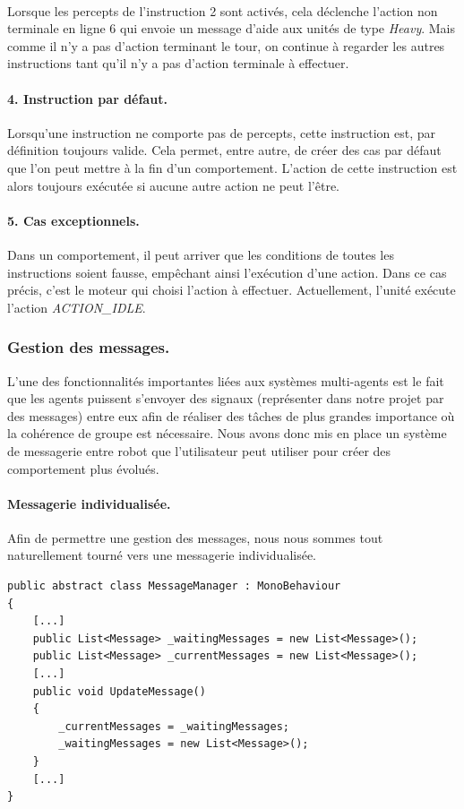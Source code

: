 \documentclass{report}
\begin{document}
\paragraph{}Lorsque les percepts de l'instruction 2 sont activés, cela déclenche l'action non terminale en ligne 6 qui envoie un message d'aide aux unités de type \textit{Heavy}. Mais comme il n'y a pas d'action terminant le tour, on continue à regarder les autres instructions tant qu'il n'y a pas d'action terminale à effectuer.

\paragraph{4. Instruction par défaut.}
Lorsqu'une instruction ne comporte pas de percepts, cette instruction est, par définition toujours valide. Cela permet, entre autre, de créer des cas par défaut que l'on peut mettre à la fin d'un comportement. L'action de cette instruction est alors toujours exécutée si aucune autre action ne peut l'être.

\paragraph{5. Cas exceptionnels.}
Dans un comportement, il peut arriver que les conditions de toutes les instructions soient fausse, empêchant ainsi l'exécution d'une action. Dans ce cas précis, c'est le moteur qui choisi l'action à effectuer. Actuellement, l'unité exécute l'action \textit{ACTION\_IDLE}.

\subsubsection{Gestion des messages.}
L'une des fonctionnalités importantes liées aux systèmes multi-agents est le fait que les agents puissent s'envoyer des signaux (représenter dans notre projet par des messages) entre eux afin de réaliser des tâches de plus grandes importance où la cohérence de groupe est nécessaire. Nous avons donc mis en place un système de messagerie entre robot que l'utilisateur peut utiliser pour créer des comportement plus évolués.

\paragraph{Messagerie individualisée.} 
Afin de permettre une gestion des messages, nous nous sommes tout naturellement tourné vers une messagerie individualisée.
 \begin{lstlisting}[language={[Sharp]C},label={lst:MessageManagerScript}, caption= Code du script MessageManager.cs]
public abstract class MessageManager : MonoBehaviour
{
	[...]
    public List<Message> _waitingMessages = new List<Message>();
    public List<Message> _currentMessages = new List<Message>();
	[...]
    public void UpdateMessage()
    {
        _currentMessages = _waitingMessages;
        _waitingMessages = new List<Message>();
    }
	[...]
}
\end{lstlisting}
\end{document}
